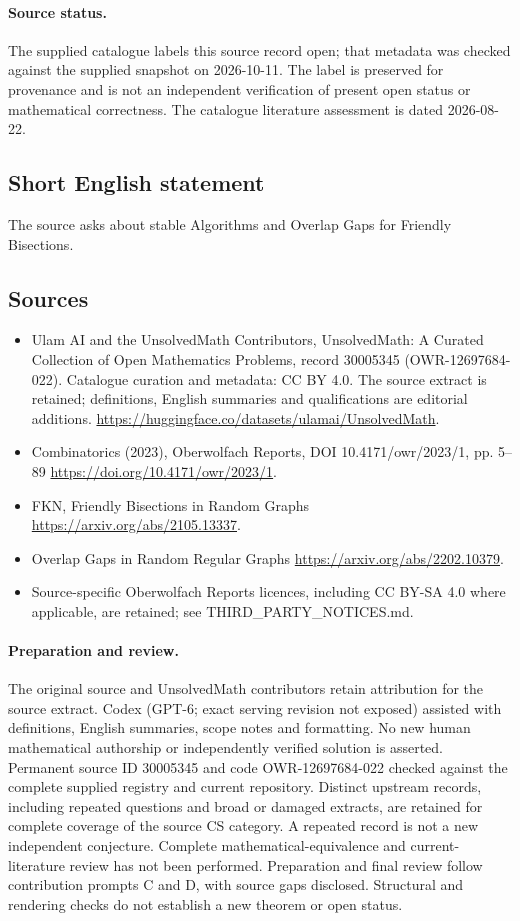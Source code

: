 \documentclass[11pt]{article}
\begin{document}
\paragraph{Source status.}
The supplied catalogue labels this source record open; that metadata was checked against the supplied snapshot on 2026-10-11. The label is preserved for provenance and is not an independent verification of present open status or mathematical correctness. The catalogue literature assessment is dated 2026-08-22.
\subsection{Short English statement}
The source asks about stable Algorithms and Overlap Gaps for Friendly Bisections.
\subsection{Sources}
\begin{itemize}
\item[\hypertarget{source:30005345:1}{S1}] Ulam AI and the UnsolvedMath Contributors, UnsolvedMath: A Curated Collection of Open Mathematics Problems, record 30005345 (OWR-12697684-022). Catalogue curation and metadata: CC BY 4.0. The source extract is retained; definitions, English summaries and qualifications are editorial additions.
\url{https://huggingface.co/datasets/ulamai/UnsolvedMath}.
\item[\hypertarget{source:30005345:2}{S2}] Combinatorics (2023), Oberwolfach Reports, DOI 10.4171/owr/2023/1, pp. 5--89
\url{https://doi.org/10.4171/owr/2023/1}.
\item[\hypertarget{source:30005345:3}{S3}] FKN, Friendly Bisections in Random Graphs
\url{https://arxiv.org/abs/2105.13337}.
\item[\hypertarget{source:30005345:4}{S4}] Overlap Gaps in Random Regular Graphs
\url{https://arxiv.org/abs/2202.10379}.
\item Source-specific Oberwolfach Reports licences, including CC BY-SA 4.0 where applicable, are retained; see THIRD\_PARTY\_NOTICES.md.
\end{itemize}
\paragraph{Preparation and review.}
The original source and UnsolvedMath contributors retain attribution for the source extract. Codex (GPT-6; exact serving revision not exposed) assisted with definitions, English summaries, scope notes and formatting. No new human mathematical authorship or independently verified solution is asserted. Permanent source ID 30005345 and code OWR-12697684-022 checked against the complete supplied registry and current repository. Distinct upstream records, including repeated questions and broad or damaged extracts, are retained for complete coverage of the source CS category. A repeated record is not a new independent conjecture. Complete mathematical-equivalence and current-literature review has not been performed. Preparation and final review follow contribution prompts C and D, with source gaps disclosed. Structural and rendering checks do not establish a new theorem or open status.
\label{end:30005345}
\end{document}
